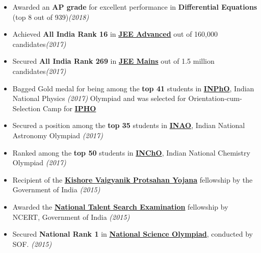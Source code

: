 \documentclass[10pt]{article}
\begin{document}
\vspace*{-5pt}
\begin{itemize}[itemsep = -0.75 mm, leftmargin=*]

\item Awarded an {\bf AP grade} for excellent performance in  {\bf Differential Equations} (top 8 out of 939)\hfill {\sl \small (2018)}
\item  Achieved {\bf All India Rank 16} in \href{https://en.wikipedia.org/wiki/Joint_Entrance_Examination_Advanced}{\bf JEE Advanced} out of 160,000 candidates\hfill{\sl \small (2017)}
\item  Secured {\bf All India Rank 269} in \href{https://en.wikipedia.org/wiki/Joint_Entrance_Examination}{\bf JEE Mains} out of 1.5 million candidates\hfill{\sl \small (2017)}
\item Bagged Gold medal for being among the {\bf top 41} students in \href{https://en.wikipedia.org/wiki/Indian_National_Physics_Olympiad}{\bf INPhO}, Indian National Physics \hfill{\sl \small (2017)} \linebreak
Olympiad and was selected for Orientation-cum-Selection Camp for \href{https://en.wikipedia.org/wiki/International_Physics_Olympiad}{\bf IPHO}
\item Secured a position among the {\bf top 35} students in \href{https://en.wikipedia.org/wiki/Indian_National_Astronomy_Olympiad}{\bf INAO}, Indian National Astronomy Olympiad \hfill {\sl \small (2017)}
\item Ranked among the {\bf top 50} students in \href{https://en.wikipedia.org/wiki/Indian_National_Chemistry_Olympiad}{\bf INChO}, Indian National Chemistry Olympiad \hfill {\sl \small (2017)}
\item Recipient of the \href{https://en.wikipedia.org/wiki/Kishore_Vaigyanik_Protsahan_Yojana}{\bf Kishore Vaigyanik Protsahan Yojana} fellowship by the Government of India \hfill{\sl \small (2015)}
\item Awarded the  \href{https://en.wikipedia.org/wiki/National_Talent_Search_Examination}{\bf National Talent Search Examination} fellowship by NCERT, Government of India \hfill{\sl \small (2015)}
\item Secured {\bf National Rank 1} in \href{http://www.sofworld.org/nso}{\textbf{National Science Olympiad}}, conducted by SOF. \hfill{\sl \small (2015)}
\end{itemize}
\end{document}

